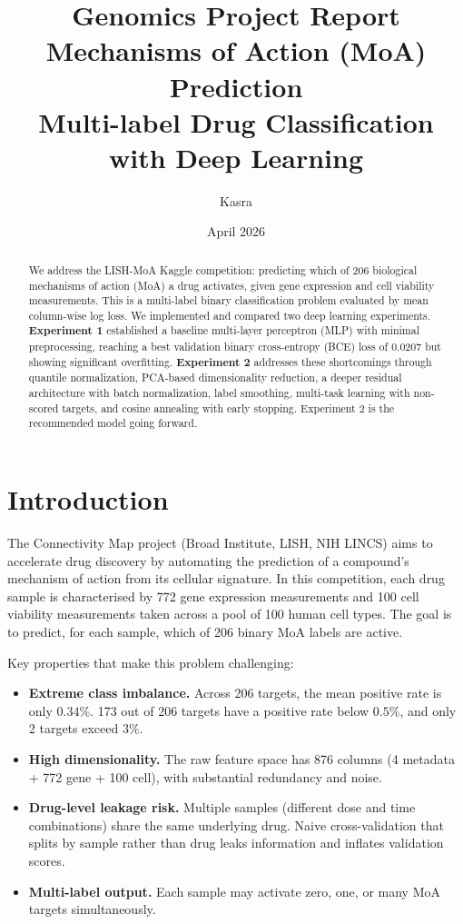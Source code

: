 \documentclass[12pt, a4paper]{article}
\title{
    \vspace{-1cm}
    {\large Genomics Project Report}\\[0.4em]
    {\LARGE \textbf{Mechanisms of Action (MoA) Prediction}}\\[0.3em]
    {\large Multi-label Drug Classification with Deep Learning}
}
\author{Kasra}
\date{April 2026}
\begin{document}
\maketitle
\thispagestyle{fancy}

\begin{abstract}
We address the LISH-MoA Kaggle competition: predicting which of 206 biological mechanisms of action (MoA) a drug activates, given gene expression and cell viability measurements. This is a multi-label binary classification problem evaluated by mean column-wise log loss. We implemented and compared two deep learning experiments. \textbf{Experiment 1} established a baseline multi-layer perceptron (MLP) with minimal preprocessing, reaching a best validation binary cross-entropy (BCE) loss of $0.0207$ but showing significant overfitting. \textbf{Experiment 2} addresses these shortcomings through quantile normalization, PCA-based dimensionality reduction, a deeper residual architecture with batch normalization, label smoothing, multi-task learning with non-scored targets, and cosine annealing with early stopping. Experiment 2 is the recommended model going forward.
\end{abstract}

\tableofcontents
\newpage

\section{Introduction}

The Connectivity Map project (Broad Institute, LISH, NIH LINCS) aims to accelerate drug discovery by automating the prediction of a compound's mechanism of action from its cellular signature. In this competition, each drug sample is characterised by 772 gene expression measurements and 100 cell viability measurements taken across a pool of 100 human cell types. The goal is to predict, for each sample, which of 206 binary MoA labels are active.

Key properties that make this problem challenging:

\begin{itemize}[noitemsep]
    \item \textbf{Extreme class imbalance.} Across 206 targets, the mean positive rate is only $0.34\%$. 173 out of 206 targets have a positive rate below $0.5\%$, and only 2 targets exceed $3\%$.
    \item \textbf{High dimensionality.} The raw feature space has 876 columns (4 metadata + 772 gene + 100 cell), with substantial redundancy and noise.
    \item \textbf{Drug-level leakage risk.} Multiple samples (different dose and time combinations) share the same underlying drug. Naive cross-validation that splits by sample rather than drug leaks information and inflates validation scores.
    \item \textbf{Multi-label output.} Each sample may activate zero, one, or many MoA targets simultaneously.
\end{itemize}
\end{document}
